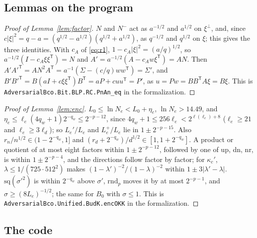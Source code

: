 \documentclass[11pt]{amsart}
\theoremstyle{definition}
\numberwithin{equation}{section}
\begin{document}
\subsection{Lemmas on the program}

\begin{proof}[Proof of Lemma~\ref{lem:factor}]
$N$ and $N^-$ act as $a^{-1/2}$ and $a^{1/2}$ on $\xi^\perp$, and, since $c|\xi|^2=q-a=(q^{1/2}-a^{1/2})(q^{1/2}+a^{1/2})$, as $q^{-1/2}$ and $q^{1/2}$ on $\xi$; this gives the three identities. With $c_A$ of \eqref{eq:r1}, $1-c_A|\xi|^2=(a/q)^{1/2}$, so $a^{-1/2}(I-c_A\xi\xi^{\mathsf T})=N$ and $A'=a^{-1/2}(A-c_Aw\xi^{\mathsf T})=AN$. Then $A'A'^{\mathsf T}=AN^2A^{\mathsf T}=a^{-1}(\Sigma-(c/q)ww^{\mathsf T})=\Sigma'$, and $B'B'^{\mathsf T}=B(aI+c\xi\xi^{\mathsf T})B^{\mathsf T}=aP+cuu^{\mathsf T}=P'$, as $u=Pw=BB^{\mathsf T}A\xi=B\xi$.
This is \texttt{AdversarialBco.Bit.BLP.RC.PnAn\_eq} in the formalization.
\end{proof}

\begin{proof}[Proof of Lemma~\ref{lem:enc}]
$L_0\le\ln N_e<L_0+\eta_e$, $\ln N_e>14.49$, and $\eta_e\le\ell_e(4q_w+1)2^{-q_w}\le2^{-p-12}$, since $4q_w+1\le256\ell_e<2^{\ell(\ell_e)+8}$ ($\ell_e\ge21$ and $\ell_e\ge3\ell_d$); so $L_e'/L_e$ and $L_e^+/L_e$ lie in $1\pm2^{-p-15}$. Also $r_n/n^{1/2}\in(1-2^{-q_w},1]$ and $(r_d+2^{-q_w})/d^{1/2}\in[1,1+2^{-q_w}]$. A product or quotient of at most eight factors within $1\pm2^{-p-12}$, followed by one of up, dn, nr, is within $1\pm2^{-p-4}$, and the directions follow factor by factor; for $\kappa_c'$, $\lambda\le1/(725\cdot512^2)$ makes $(1-\lambda')^{-2}/(1-\lambda)^{-2}$ within $1\pm3|\lambda'-\lambda|$. $\mathrm{sq}(\sigma'^2)$ is within $2^{-q_w}$ above $\sigma'$, $\mathrm{rnd}_p$ moves it by at most $2^{-p-1}$, and $\sigma\ge(8L_e)^{-1/2}$; the same for $B_0$ with $\sigma\le1$.
This is \texttt{AdversarialBco.Unified.BudK.encOKK} in the formalization.
\end{proof}

\subsection{The code}
\end{document}
